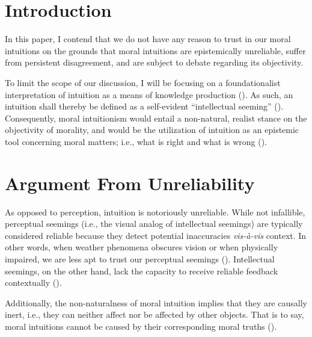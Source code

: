 \documentclass[12pt, a4paper, twoside]{article}
\begin{document}
\maketitle{}

\section{Introduction}

In this paper, I contend that we do not have any reason to trust in our moral intuitions on the grounds that moral intuitions are epistemically unreliable, suffer from persistent disagreement, and are subject to debate regarding its objectivity. 

To limit the scope of our discussion, I will be focusing on a foundationalist interpretation of intuition as a means of knowledge production (\cite{britannica2024intuition}). As such, an intuition shall thereby be defined as a self-evident “intellectual seeming” (\cites{audi1999self}[p.\ 10]{bealer1998intuition}[p.\ 102]{huemer2005ethical}[p.\ 1]{ogar2016critique}). Consequently, moral intuitionism would entail a non-natural, realist stance on the objectivity of morality, and would be the utilization of intuition as an epistemic tool concerning moral matters; i.e., what is right and what is wrong (\cites{ethics2024moral}{stratton2014intuitionism}).  

\section{Argument From Unreliability}

As opposed to perception, intuition is notoriously unreliable. While not infallible, perceptual seemings (i.e., the visual analog of intellectual seemings) are typically considered reliable because they detect potential inaccuracies \emph{vis-à-vis} context. In other words, when weather phenomena obscures vision or when physically impaired, we are less apt to trust our perceptual seemings (\cite[p.\ 8]{cecchini2024reliability}). Intellectual seemings, on the other hand, lack the capacity to receive reliable feedback contextually (\cite[pp.\ 17–18]{destefano2014reliability}).

Additionally, the non-naturalness of moral intuition implies that they are causally inert, i.e., they can neither affect nor be affected by other objects. That is to say, moral intuitions cannot be caused by their corresponding moral truths (\cites[p.\ 1]{hayward2019immoral}{stratton2014intuitionism}).
\end{document}
